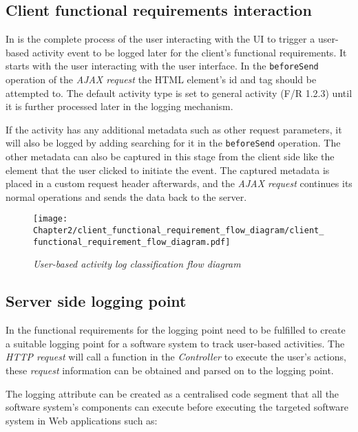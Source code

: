 \subsection{Client functional requirements interaction}
\par In  is the complete process of the user interacting with the UI to trigger a user-based activity event to be logged later for the client's functional requirements. It starts with the user interacting with the user interface. In the \texttt{beforeSend} operation of the \textit{AJAX request} the HTML element's id and tag should be attempted to. The default activity type is set to general activity (F/R 1.2.3) until it is further processed later in the logging mechanism.\par If the activity has any additional metadata such as other request parameters, it will also be logged by adding searching for it in the \texttt{beforeSend} operation. The other metadata can also be captured in this stage from the client side like the element that the user clicked to initiate the event. The captured metadata is placed in a custom request header afterwards, and the \textit{AJAX request} continues its normal operations and sends the data back to the server.

\begin{figure}[!htb] %
	\centering %
	\texttt{[image: Chapter2/client\_functional\_requirement\_flow\_diagram/client\_functional\_requirement\_flow\_diagram.pdf]}
	\caption[User-based activity log classification flow diagram]
	{\textit{User-based activity log classification flow diagram}}\label{fig:ch2_user_based_actvity_classification}
\end{figure}

\clearpage

\subsection{Server side logging point}\label{sec:ch2_serverSideLoggingpoint}
In  the functional requirements for the logging point need to be fulfilled to create a suitable logging point for a software system to track user-based activities. The \textit{HTTP request} will call a function in the \textit{Controller} to execute the user's actions, these \textit{request} information can be obtained and parsed on to the logging point.\par The logging attribute can be created as a centralised code segment that all the software system's components can execute before executing the targeted software system in Web applications such as:

